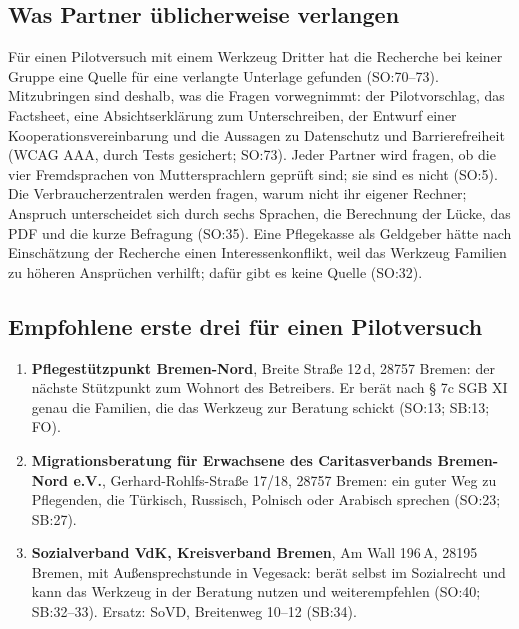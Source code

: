 \documentclass[10pt,parskip=half-]{scrartcl}
\begin{document}
\subsection{Was Partner üblicherweise verlangen}
Für einen Pilotversuch mit einem Werkzeug Dritter hat die Recherche bei keiner Gruppe eine
Quelle für eine verlangte Unterlage gefunden (SO:70--73). Mitzubringen sind deshalb, was die
Fragen vorwegnimmt: der Pilotvorschlag, das Factsheet, eine Absichtserklärung zum Unterschreiben,
der Entwurf einer Kooperationsvereinbarung und die Aussagen zu Datenschutz und Barrierefreiheit
(WCAG AAA, durch Tests gesichert; SO:73). Jeder Partner wird fragen, ob die vier Fremdsprachen
von Muttersprachlern geprüft sind; sie sind es nicht (SO:5). Die Verbraucherzentralen werden
fragen, warum nicht ihr eigener Rechner; Anspruch unterscheidet sich durch sechs Sprachen, die
Berechnung der Lücke, das PDF und die kurze Befragung (SO:35). Eine Pflegekasse als Geldgeber
hätte nach Einschätzung der Recherche einen Interessenkonflikt, weil das Werkzeug Familien zu
höheren Ansprüchen verhilft; dafür gibt es keine Quelle (SO:32).

\subsection{Empfohlene erste drei für einen Pilotversuch}
\begin{enumerate}
  \item \textbf{Pflegestützpunkt Bremen-Nord}, Breite Straße 12\,d, 28757 Bremen: der nächste
    Stützpunkt zum Wohnort des Betreibers. Er berät nach § 7c SGB XI genau die Familien, die das
    Werkzeug zur Beratung schickt (SO:13; SB:13; FO).
  \item \textbf{Migrationsberatung für Erwachsene des Caritasverbands Bremen-Nord e.V.},
    Gerhard-Rohlfs-Straße 17/18, 28757 Bremen: ein guter Weg zu Pflegenden, die Türkisch,
    Russisch, Polnisch oder Arabisch sprechen (SO:23; SB:27).
  \item \textbf{Sozialverband VdK, Kreisverband Bremen}, Am Wall 196\,A, 28195 Bremen, mit
    Außensprechstunde in Vegesack: berät selbst im Sozialrecht und kann das Werkzeug in der
    Beratung nutzen und weiterempfehlen (SO:40; SB:32--33). Ersatz: SoVD, Breitenweg 10--12
    (SB:34).
\end{enumerate}
\end{document}
